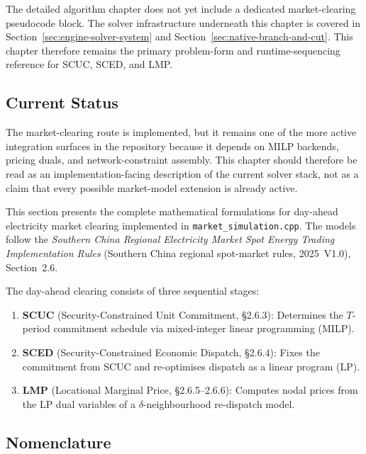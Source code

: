 The detailed algorithm chapter does not yet include a dedicated market-clearing
pseudocode block.  The solver infrastructure underneath this chapter is covered
in Section~\ref{sec:engine-solver-system} and Section~\ref{sec:native-branch-and-cut}.
This chapter therefore remains the primary problem-form and runtime-sequencing
reference for SCUC, SCED, and LMP.

\subsection{Current Status}

The market-clearing route is implemented, but it remains one of the more active
integration surfaces in the repository because it depends on MILP backends,
pricing duals, and network-constraint assembly.  This chapter should therefore
be read as an implementation-facing description of the current solver stack,
not as a claim that every possible market-model extension is already active.

This section presents the complete mathematical formulations for day-ahead
electricity market clearing implemented in \texttt{market\_simulation.cpp}.
The models follow the \emph{Southern China Regional Electricity Market Spot Energy
Trading Implementation Rules} (Southern China regional spot-market rules,
2025~V1.0), Section~2.6.

The day-ahead clearing consists of three sequential stages:
\begin{enumerate}
  \item \textbf{SCUC} (Security-Constrained Unit Commitment, §2.6.3):
        Determines the $T$-period commitment schedule via mixed-integer linear
        programming (MILP).
  \item \textbf{SCED} (Security-Constrained Economic Dispatch, §2.6.4):
        Fixes the commitment from SCUC and re-optimises dispatch as a linear
        program (LP).
  \item \textbf{LMP} (Locational Marginal Price, §2.6.5--2.6.6):
        Computes nodal prices from the LP dual variables of a
        $\delta$-neighbourhood re-dispatch model.
\end{enumerate}

\subsection{Nomenclature}\label{sec:market-nomenclature}

